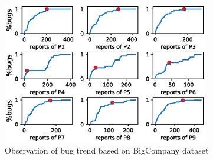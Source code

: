 \begin{figure}[t!]
\centering
\includegraphics[width=9cm]{figure/bugTrend.eps}
\caption{Observation of bug trend based on BigCompany dataset}

\label{fig:observation}
\end{figure}
